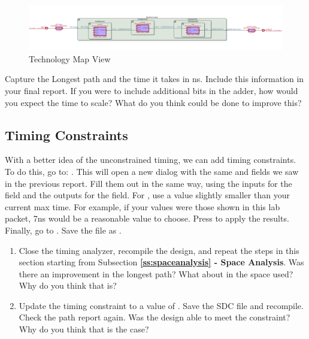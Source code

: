 \documentclass[12pt]{betterjournal}
\begin{document}
\begin{figure}
    \centering
    \includegraphics[width=\linewidth]{techmap.png}
    \caption{Technology Map View}
    \label{fig:techmap}
\end{figure}
\hfill\break
\begin{question}
    Capture the Longest path and the time it takes in ns. Include this information in your final report. If you were to include additional bits in the adder, how would you expect the time to scale? What do you think could be done to improve this?
\end{question}
\clearpage
\subsection{Timing Constraints}
With a better idea of the unconstrained timing, we can add timing constraints. To do this, go to: . This will open a new dialog with the same  and  fields we saw in the previous report. Fill them out in the same way, using the inputs for the  field and the outputs for the  field. For , use a value slightly smaller than your current max time. For example, if your values were those shown in this lab packet, 7ns would be a reasonable value to choose. Press  to apply the results. Finally, go to . Save the file as .
\hfill\break
\begin{question}[Improvement]
\begin{enumerate}
    \item Close the timing analyzer, recompile the design, and repeat the steps in this section starting from Subsection \textbf{\ref{ss:spaceanalysis} - Space Analysis}. Was there an improvement in the longest path? What about in the space used? Why do you think that is?
    \item Update the timing constraint to a value of . Save the SDC file and recompile. Check the path report again. Was the design able to meet the constraint? Why do you think that is the case?
\end{enumerate}
    
\end{question}
\end{document}
